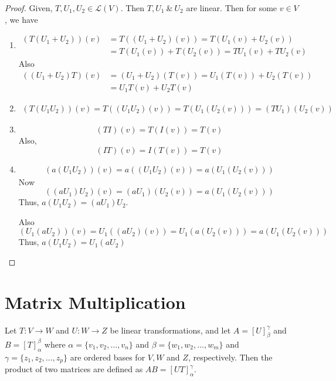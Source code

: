 \documentclass[12pt, a4paper]{article}
\theoremstyle{definition}
\theoremstyle{remark}
\begin{document}
\begin{proof}
    Given, $T,U_1, U_2 \in \mathscr{L}(V)$. Then $T,U_1 \ \& \ U_2$ are linear. Then for some $v \in V$, we have
    \begin{enumerate}
        \item \begin{align*}
            (T(U_1+U_2))(v) &= T((U_1+U_2)(v)) = T(U_1(v)+U_2(v)) \\
            &= T(U_1(v))+T(U_2(v)) = TU_1(v)+TU_2(v)
        \end{align*}
        Also
        \begin{align*}
            ((U_1+U_2)T)(v) &= (U_1+U_2)(T(v)) = U_1(T(v))+U_2(T(v)) \\
            &= U_1T(v)+U_2T(v)
        \end{align*}

        \item \begin{align*}
            (T(U_1U_2))(v) = T((U_1U_2)(v)) = T(U_1(U_2(v))) = (TU_1)(U_2(v))
        \end{align*}

        \item \[
        (TI)(v) = T(I(v)) = T(v)
        \]
        Also, \[
        (IT)(v) = I(T(v)) = T(v)
        \]

        \item \begin{align*}
            (a(U_1U_2))(v) = a((U_1U_2)(v)) = a(U_1(U_2(v)))
        \end{align*}
        Now \[
        ((aU_1)U_2)(v) = (aU_1)(U_2(v)) = a(U_1(U_2(v)))
        \]
        Thus, $a(U_1U_2) = (aU_1)U_2$.

        \noindent Also \[
        (U_1(aU_2))(v) = U_1((aU_2)(v))=U_1(a(U_2(v))) = a(U_1(U_2(v)))
        \]
        Thus, $a(U_1U_2)=U_1(aU_2)$
    \end{enumerate}
\end{proof}

\section{Matrix Multiplication}
Let $T:V \to W$ and $U:W \to Z$ be linear transformations, and let $A = [U]_\beta^\gamma$ and $B = [T]_\alpha^\beta$ where $\alpha = \{v_1,v_2,\ldots,v_n\}$ and $\beta = \{w_1,w_2,\ldots,w_m\}$ and $\gamma = \{z_1,z_2,\ldots,z_p\}$ are ordered bases for $V,W$ and $Z$, respectively. Then the product of two matrices are defined as $AB =[UT]_\alpha^\gamma$.
\end{document}
